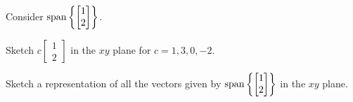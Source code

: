 \begin{applicationActivities}
\begin{activity}{10}
  Consider \(\operatorname{span}\left\{\begin{bmatrix}1\\2\end{bmatrix}\right\}\).
  \begin{subactivity}
    Sketch
    \(c\begin{bmatrix}1\\2\end{bmatrix}\) in the \(xy\) plane
    for \(c=1,3,0,-2\).
  \end{subactivity}
  \begin{subactivity}
    Sketch a representation of all the vectors given by
    \(\operatorname{span}\left\{\begin{bmatrix}1\\2\end{bmatrix}\right\}\)
    in the \(xy\) plane.
  \end{subactivity}
\end{activity}






\end{applicationActivities}
